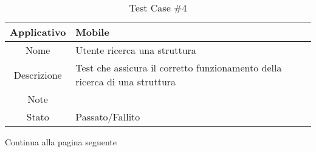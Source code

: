 
\begin{table}[H]
    \centering
    \footnotesize
    \caption{Test Case \#4}
    \begin{tabularx}{\textwidth}{|c|X|}
        \hline
        Applicativo & Mobile\\
        \hline
        Nome & Utente ricerca una struttura  \\
        \hline
        Descrizione & Test che assicura il corretto funzionamento della ricerca di una struttura\\
        \hline
        Note &  \\
        \hline
        Stato & Passato/Fallito\\
        \hline

    \end{tabularx}
    Continua alla pagina seguente
    \setlength{\tabcolsep}{8pt}
    \renewcommand{\arraystretch}{1.5}
\end{table}
